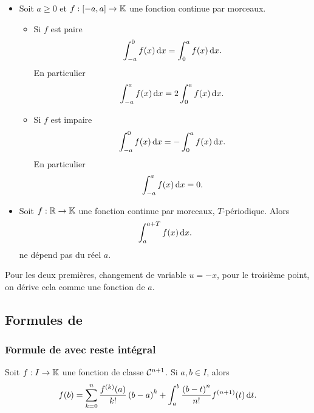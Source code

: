 \documentclass{magnolia}
\begin{document}
\begin{proposition}[utile=-3]
$\quad$
\begin{itemize}
\item Soit $a\geq 0$ et $f:[-a,a]\to\mathbb{K}$ une fonction continue par morceaux.
  \begin{itemize}
  \item Si $f$ est paire
    \[\int_{-a}^{0} f(x)\,\text{d}x=\int_{0}^{a} f(x)\,\text{d}x.\]
    En particulier
    \[\int_{-a}^{a} f(x)\,\text{d}x=2\int_{0}^{a} f(x)\,\text{d}x.\]
  \item Si $f$ est impaire
    \[\int_{-a}^{0} f(x)\,\text{d}x=-\int_{0}^{a} f(x)\,\text{d}x.\]
    En particulier
    \[\int_{-a}^{a} f(x)\,\text{d}x=0.\]
  \end{itemize}
\item Soit $f:\mathbb{R}\to\mathbb{K}$ une fonction continue par morceaux, $T$-périodique. Alors
  \[\int_{a}^{a+T} f(x)\,\text{d}x.\]
  ne dépend pas du réel $a$.
\end{itemize}
\end{proposition}

\begin{preuve}
Pour les deux premières, changement de variable $u=-x$, pour le troisième point, on dérive cela comme une fonction de $a$.
\end{preuve}


\subsection{Formules de }
\subsubsection{Formule de  avec reste intégral}
\begin{proposition}[utile=3, nom=Formule de \nom{Taylor} avec reste intégral]
Soit $f:I\to\mathbb{K}$ une fonction de classe $\mathcal{C}^{n+1}$. Si $a,b\in I$, alors
  \[f(b)=\sum_{k=0}^n \frac{f^{(k)}(a)}{k!}\left(b-a\right)^k+
           \int_{a}^{b} \frac{\left(b-t\right)^n}{n!}f^{(n+1)}(t)\,\text{d}t.\]
\end{proposition}
\end{document}

